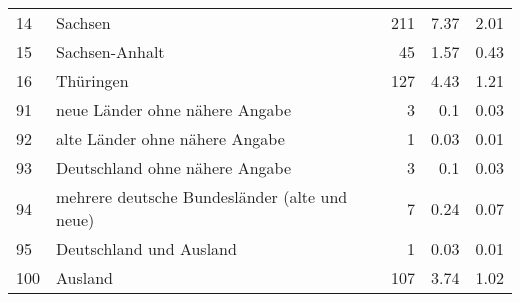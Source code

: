 \begin{longtable}{lXrrr}
        14 & \multicolumn{1}{X}{Sachsen} & %
          \num{211} &
          \num[round-mode=places,round-precision=2]{7.37} &
          \num[round-mode=places,round-precision=2]{2.01} \\

        15 & \multicolumn{1}{X}{Sachsen-Anhalt} & %
          \num{45} &
          \num[round-mode=places,round-precision=2]{1.57} &
          \num[round-mode=places,round-precision=2]{0.43} \\

        16 & \multicolumn{1}{X}{Thüringen} & %
          \num{127} &
          \num[round-mode=places,round-precision=2]{4.43} &
          \num[round-mode=places,round-precision=2]{1.21} \\

        91 & \multicolumn{1}{X}{neue Länder ohne nähere Angabe} & %
          \num{3} &
          \num[round-mode=places,round-precision=2]{0.1} &
          \num[round-mode=places,round-precision=2]{0.03} \\

        92 & \multicolumn{1}{X}{alte Länder ohne nähere Angabe} & %
          \num{1} &
          \num[round-mode=places,round-precision=2]{0.03} &
          \num[round-mode=places,round-precision=2]{0.01} \\

        93 & \multicolumn{1}{X}{Deutschland ohne nähere Angabe} & %
          \num{3} &
          \num[round-mode=places,round-precision=2]{0.1} &
          \num[round-mode=places,round-precision=2]{0.03} \\

        94 & \multicolumn{1}{X}{mehrere deutsche Bundesländer (alte und neue)} & %
          \num{7} &
          \num[round-mode=places,round-precision=2]{0.24} &
          \num[round-mode=places,round-precision=2]{0.07} \\

        95 & \multicolumn{1}{X}{Deutschland und Ausland} & %
          \num{1} &
          \num[round-mode=places,round-precision=2]{0.03} &
          \num[round-mode=places,round-precision=2]{0.01} \\

        100 & \multicolumn{1}{X}{Ausland} & %
          \num{107} &
          \num[round-mode=places,round-precision=2]{3.74} &
          \num[round-mode=places,round-precision=2]{1.02} \\


\end{longtable}
